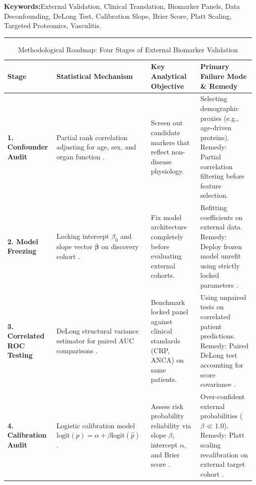 \documentclass[11pt,twoside,openright]{book}
\begin{document}
\noindent
\textbf{Keywords:}\enspace External Validation, Clinical Translation, Biomarker Panels, Data Deconfounding, DeLong Test, Calibration Slope, Brier Score, Platt Scaling, Targeted Proteomics, Vasculitis.

\vspace{0.8em}
\noindent\rule{\textwidth}{0.4pt}


\begin{table}[ht]
\centering
\caption{Methodological Roadmap: Four Stages of External Biomarker Validation}
\label{tab:validation_roadmap}
\small
\begin{tabularx}{\textwidth}{l p{3.8cm} p{4.2cm} X}
\toprule
\textbf{Stage} & \textbf{Statistical Mechanism} & \textbf{Key Analytical Objective} & \textbf{Primary Failure Mode \& Remedy} \\
\midrule
\textbf{1. Confounder Audit} & Partial rank correlation adjusting for age, sex, and organ function \cite{birkner2026metadeconfoundr, leek2010tackling}. & Screen out candidate markers that reflect non-disease physiology. & Selecting demographic proxies (e.g., age-driven proteins). Remedy: Partial correlation filtering before feature selection. \\
\addlinespace
\textbf{2. Model Freezing} & Locking intercept $\beta_0$ and slope vector $\boldsymbol{\beta}$ on discovery cohort \cite{collins2015transparent, steyerberg2010towards}. & Fix model architecture completely before evaluating external cohorts. & Refitting coefficients on external data. Remedy: Deploy frozen model unrefit using strictly locked parameters \cite{varma2006bias}. \\
\addlinespace
\textbf{3. Correlated ROC Testing} & DeLong structural variance estimator for paired AUC comparisons \cite{delong1988comparing, robin2011proc}. & Benchmark locked panel against clinical standards (CRP, ANCA) on same patients. & Using unpaired tests on correlated patient predictions. Remedy: Paired DeLong test accounting for score covariance \cite{mcshane2005reporting}. \\
\addlinespace
\textbf{4. Calibration Audit} & Logistic calibration model $\text{logit}(p) = \alpha + \beta \text{logit}(\hat{p})$ \cite{steyerberg2010towards, van2016calibration}. & Assess risk probability reliability via slope $\beta$, intercept $\alpha$, and Brier score \cite{brier1950verification}. & Over-confident external probabilities ($\beta \ll 1.0$). Remedy: Platt scaling recalibration on external target cohort \cite{platt1999probabilistic}. \\
\bottomrule
\end{tabularx}
\end{table}
\end{document}
